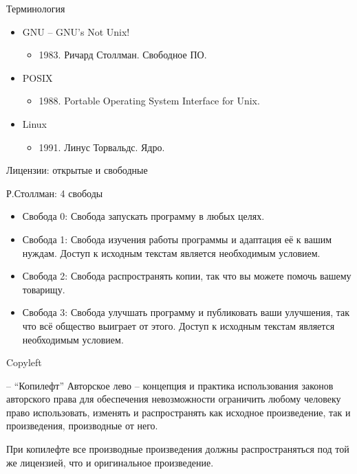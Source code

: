 \documentclass[ignorenonframetext, professionalfonts, hyperref={pdftex, unicode}]{beamer}
\begin{document}
\begin{frame}{Терминология}
	\begin{itemize}
		\item GNU -- GNU's Not Unix!
		\begin{itemize}
			\item 1983. Ричард Столлман. Свободное ПО.
		\end{itemize}

		\pause

		\item POSIX
		\begin{itemize}
			\item 1988. Portable Operating System Interface for Unix. 
		\end{itemize}

		\pause

		\item Linux
		\begin{itemize}
			\item 1991. Линус Торвальдс. Ядро.
		\end{itemize}

	\end{itemize}
\end{frame}

\begin{frame}{Лицензии: открытые и свободные}

	\begin{block}{ Р.Столлман: 4 свободы}

		\begin{itemize}
			\item Свобода 0: Свобода запускать программу в любых целях.
			\item Свобода 1: Свобода изучения работы программы и адаптация её к вашим нуждам. 
				Доступ к исходным текстам является необходимым условием.
			\item Свобода 2: Свобода распространять копии,  так что вы можете помочь вашему товарищу.
			\item Свобода 3: Свобода улучшать программу и публиковать ваши улучшения,
				так что всё общество выиграет от этого.
				Доступ к исходным текстам является необходимым условием.
		\end{itemize}
	\end{block}


\end{frame}

\begin{frame}{Copyleft }

	\begin{block}{ \textcopyleft  -- ``Копилефт''}
	Авторское лево -- концепция и практика использования законов авторского права для обеспечения 
	невозможности ограничить любому человеку право использовать,  изменять и распространять как 
	исходное произведение,  так и произведения,  производные от него.
	\end{block}


	При копилефте все производные произведения должны распространяться под той же лицензией,
	что и оригинальное произведение.

\end{frame}
\end{document}
